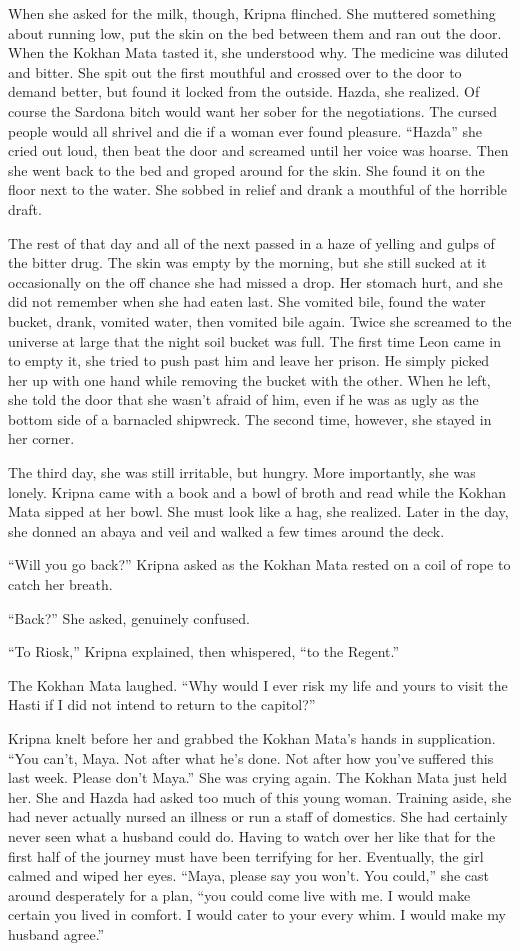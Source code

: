 \documentclass{article}
\begin{document}
	When she asked for the milk, though, Kripna flinched. She muttered something about running low, put the skin on the bed between them and ran out the door. When the Kokhan Mata tasted it, she understood why. The medicine was diluted and bitter. She spit out the first mouthful and crossed over to the door to demand better, but found it locked from the outside. Hazda, she realized. Of course the Sardona bitch would want her sober for the negotiations. The cursed people would all shrivel and die if a woman ever found pleasure. “Hazda” she cried out loud, then beat the door and screamed until her voice was hoarse. Then she went back to the bed and groped around for the skin. She found it on the floor next to the water. She sobbed in relief and drank a mouthful of the horrible draft.
	
	The rest of that day and all of the next passed in a haze of yelling and gulps of the bitter drug. The skin was empty by the morning, but she still sucked at it occasionally on the off chance she had missed a drop. Her stomach hurt, and she did not remember when she had eaten last. She vomited bile, found the water bucket, drank, vomited water, then vomited bile again. Twice she screamed to the universe at large that the night soil bucket was full. The first time Leon came in to empty it, she tried to push past him and leave her prison. He simply picked her up with one hand while removing the bucket with the other. When he left, she told the door that she wasn’t afraid of him, even if he was as ugly as the bottom side of a barnacled shipwreck. The second time, however, she stayed in her corner.
	
	The third day, she was still irritable, but hungry. More importantly, she was lonely. Kripna came with a book and a bowl of broth and read while the Kokhan Mata sipped at her bowl. She must look like a hag, she realized. Later in the day, she donned an abaya and veil and walked a few times around the deck. 
	
	“Will you go back?” Kripna asked as the Kokhan Mata rested on a coil of rope to catch her breath. 
	
	“Back?” She asked, genuinely confused. 
	
	“To Riosk,” Kripna explained, then whispered, “to the Regent.” 
	
	The Kokhan Mata laughed. “Why would I ever risk my life and yours to visit the Hasti if I did not intend to return to the capitol?”
	
	Kripna knelt before her and grabbed the Kokhan Mata’s hands in supplication. “You can’t, Maya. Not after what he’s done. Not after how you’ve suffered this last week. Please don’t Maya.” She was crying again. The Kokhan Mata just held her. She and Hazda had asked too much of this young woman. Training aside, she had never actually nursed an illness or run a staff of domestics. She had certainly never seen what a husband could do. Having to watch over her like that for the first half of the journey must have been terrifying for her. Eventually, the girl calmed and wiped her eyes. “Maya, please say you won’t. You could,” she cast around desperately for a plan, “you could come live with me. I would make certain you lived in comfort. I would cater to your every whim. I would make my husband agree.”
	
\end{document}
